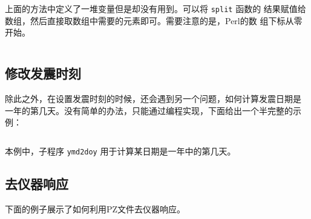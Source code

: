 上面的方法中定义了一堆变量但是却没有用到。可以将 \texttt{split} 函数的
结果赋值给数组，然后直接取数组中需要的元素即可。需要注意的是，Perl的数
组下标从零开始。
\inputminted{perl}{./call-in-script/rename2.pl}

\subsection{修改发震时刻}
\label{subsec:ch-origin-perl}
除此之外，在设置发震时刻的时候，还会遇到另一个问题，如何计算发震日期是
一年的第几天。没有简单的办法，只能通过编程实现，下面给出一个半完整的示例：
\inputminted{perl}{./call-in-script/ch-origin.pl}
本例中，子程序 \texttt{ymd2doy} 用于计算某日期是一年中的第几天。

\subsection{去仪器响应}
下面的例子展示了如何利用PZ文件去仪器响应。
\inputminted{perl}{./call-in-script/transfer.pl}
